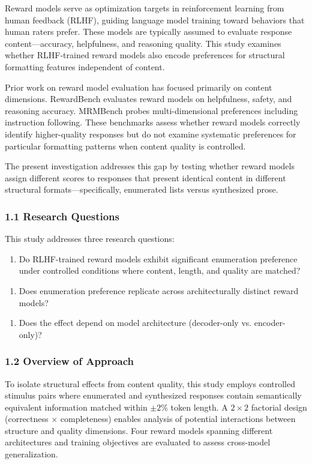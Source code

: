 
Reward models serve as optimization targets in reinforcement learning from human feedback (RLHF), guiding language model training toward behaviors that human raters prefer. These models are typically assumed to evaluate response content---accuracy, helpfulness, and reasoning quality. This study examines whether RLHF-trained reward models also encode preferences for structural formatting features independent of content.

Prior work on reward model evaluation has focused primarily on content dimensions. RewardBench evaluates reward models on helpfulness, safety, and reasoning accuracy. MRMBench probes multi-dimensional preferences including instruction following. These benchmarks assess whether reward models correctly identify higher-quality responses but do not examine systematic preferences for particular formatting patterns when content quality is controlled.

The present investigation addresses this gap by testing whether reward models assign different scores to responses that present identical content in different structural formats---specifically, enumerated lists versus synthesized prose.

\subsubsection{1.1 Research Questions}

This study addresses three research questions:

\begin{enumerate}
\item Do RLHF-trained reward models exhibit significant enumeration preference under controlled conditions where content, length, and quality are matched?
\end{enumerate}

\begin{enumerate}
\item Does enumeration preference replicate across architecturally distinct reward models?
\end{enumerate}

\begin{enumerate}
\item Does the effect depend on model architecture (decoder-only vs. encoder-only)?
\end{enumerate}

\subsubsection{1.2 Overview of Approach}

To isolate structural effects from content quality, this study employs controlled stimulus pairs where enumerated and synthesized responses contain semantically equivalent information matched within $\pm 2$\% token length. A $2\times 2$ factorial design (correctness $\times$ completeness) enables analysis of potential interactions between structure and quality dimensions. Four reward models spanning different architectures and training objectives are evaluated to assess cross-model generalization.

